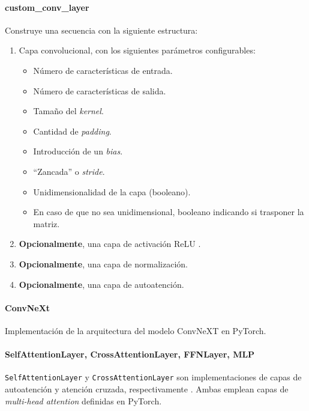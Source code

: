 \documentclass[a4paper]{article}
\begin{document}
\paragraph{custom\_conv\_layer}

Construye una secuencia con la siguiente estructura:

\begin{enumerate}
  \item{Capa convolucional, con los siguientes parámetros configurables:
    \begin{itemize}
      \item{Número de características de entrada.}
      \item{Número de características de salida.}
      \item{Tamaño del \textit{kernel}.}
      \item{Cantidad de \textit{padding}.}
      \item{Introducción de un \textit{bias}.}
      \item{``Zancada'' o \textit{stride}.}
      \item{Unidimensionalidad de la capa (booleano).}
      \item{En caso de que no sea unidimensional, booleano indicando si trasponer la matriz.}
    \end{itemize}
  }
  \item{\textbf{Opcionalmente}, una capa de activación ReLU \cite{ReLU}.}
  \item{\textbf{Opcionalmente}, una capa de normalización.}
  \item{\textbf{Opcionalmente}, una capa de autoatención.}
\end{enumerate}

\paragraph{ConvNeXt}

Implementación de la arquitectura del modelo ConvNeXT \cite{ConvNeXT} en PyTorch.

\paragraph{SelfAttentionLayer, CrossAttentionLayer, FFNLayer, MLP}

\texttt{SelfAttentionLayer} y \texttt{CrossAttentionLayer} son implementaciones de capas de autoatención y atención cruzada, respectivamente \cite{Attention}. Ambas emplean capas de \textit{multi-head attention} definidas en PyTorch.
\end{document}
